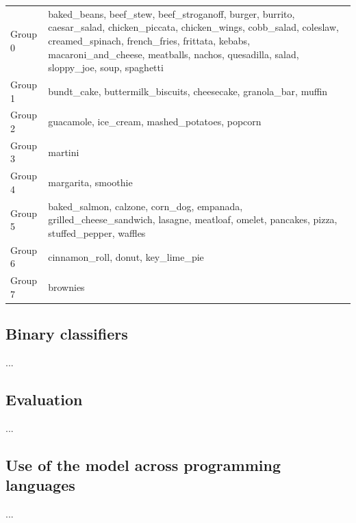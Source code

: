 \documentclass[10pt]{article}
\newif\ifen
\newif\ifde
\newcommand{\en}[1]{\ifen#1\fi}
\newcommand{\de}[1]{\ifde#1\fi}
\begin{document}
					\renewcommand\theadfont{\bfseries}
					\begin{table}[htb]
						\small
						\centering
						{\def\arraystretch{2}\tabcolsep=5pt
							\begin{tabularx}{\linewidth}{ l | X }
								\hline
								\thead[l]{Group} & \thead[l]{Classes} \\
								\hline
								Group 0 & baked\_beans, beef\_stew, beef\_stroganoff, burger, burrito, caesar\_salad, chicken\_piccata, chicken\_wings, cobb\_salad, coleslaw, creamed\_spinach, french\_fries, frittata, kebabs, macaroni\_and\_cheese, meatballs, nachos, quesadilla, salad, sloppy\_joe, soup, spaghetti \\
								Group 1 & bundt\_cake, buttermilk\_biscuits, cheesecake, granola\_bar, muffin \\
								Group 2 & guacamole, ice\_cream, mashed\_potatoes, popcorn \\
								Group 3 & martini \\
								Group 4 & margarita, smoothie \\
								Group 5 & baked\_salmon, calzone, corn\_dog, empanada, grilled\_cheese\_sandwich, lasagne, meatloaf, omelet, pancakes, pizza, stuffed\_pepper, waffles \\
								Group 6 & cinnamon\_roll, donut, key\_lime\_pie \\
								Group 7 & brownies
							\end{tabularx}
						}
						\label{tbl:table_grouped_classes_ahc}
					\end{table}
					
					\de{}
					\en{}
		
		\subsection{Binary classifiers}
			\noindent ...
		
		\subsection{Evaluation}
			\noindent ...
		
		\subsection{Use of the model across programming languages}
			\noindent ...
\end{document}

